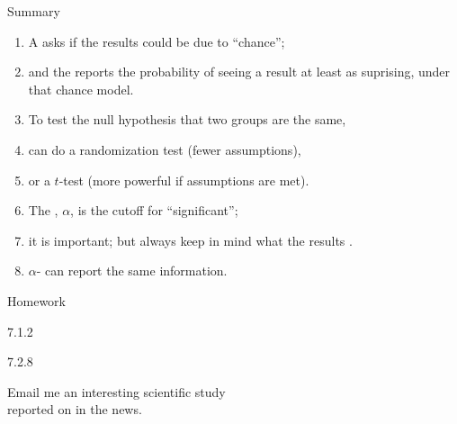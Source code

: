 \begin{frame}{Summary}
  \begin{enumerate}
    \item A  asks if the results could be due to ``chance'';
    \item and the  reports the probability of seeing a result at least as suprising, under that chance model.
    \item To test the null hypothesis that two groups are the same,
    \item can do a randomization test (fewer assumptions),
    \item or a $t$-test (more powerful if assumptions are met).
    \item The , $\alpha$, is the cutoff for ``significant'';
    \item it is important; but always keep in mind what the results .
    \item $\alpha$- can report the same information.
  \end{enumerate}
\end{frame}

\begin{frame}{Homework}
  \begin{center}


    7.1.2


    \vspace{2em}

    7.2.8


    \vspace{2em}

    Email me an interesting scientific study \\
    reported on in the news.

  \end{center}
\end{frame}








